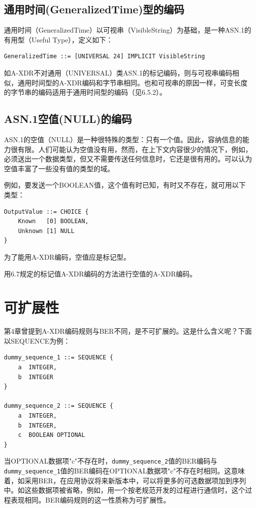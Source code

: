 \documentclass[a4paper,11pt]{ctexart}
\begin{document}
\subsection{通用时间(GeneralizedTime)型的编码}

通用时间（GeneralizedTime）以可视串（VisibleString）为基础，是一种ASN.1的有用型（Useful Type），定义如下：
\begin{verbatim}
GeneralizedTime ::= [UNIVERSAL 24] IMPLICIT VisibleString
\end{verbatim}

如A-XDR不对通用（UNIVERSAL）类ASN.1的标记编码，则与可视串编码相似，通用时间型的A-XDR编码和字节串相同。也和可视串的原因一样，可变长度的字节串的编码适用于通用时间型的编码（见6.5.2）。

\subsection{ASN.1空值(NULL)的编码}

ASN.1的空值（NULL）是一种很特殊的类型：只有一个值。因此，容纳信息的能力很有限。人们可能认为空值没有用，然而，在上下文内容很少的情况下，例如，必须送出一个数据类型，但又不需要传送任何信息时，它还是很有用的。可以认为空值丰富了一些没有值的类型的域。

例如，要发送一个BOOLEAN值，这个值有时已知，有时又不存在，就可用以下类型：
\begin{verbatim}
OutputValue ::= CHOICE {
    Known   [0] BOOLEAN,
    Unknown [1] NULL
}
\end{verbatim}

为了能用A-XDR编码，空值应是标记型。

用6.7规定的标记值A-XDR编码的方法进行空值的A-XDR编码。

\appendix
\section{可扩展性}

第4章曾提到A-XDR编码规则与BER不同，是不可扩展的。这是什么含义呢？下面以SEQUENCE为例：

\begin{verbatim}
dummy_sequence_1 ::= SEQUENCE {
    a  INTEGER,
    b  INTEGER
}

dummy_sequence_2 ::= SEQUENCE {
    a  INTEGER,
    b  INTEGER,
    c  BOOLEAN OPTIONAL
}
\end{verbatim}

当OPTIONAL数据项"c"不存在时，\texttt{dummy\_sequence\_2}值的BER编码与\texttt{dummy\_sequence\_1}值的BER编码在OPTIONAL数据项"c"不存在时相同。这意味着，如采用BER，在应用协议将来新版本中，可以将更多的可选数据项加到序列中。如这些数据项被省略，例如，用一个按老规范开发的过程进行通信时，这个过程表现相同。BER编码规则的这一性质称为可扩展性。
\end{document}
